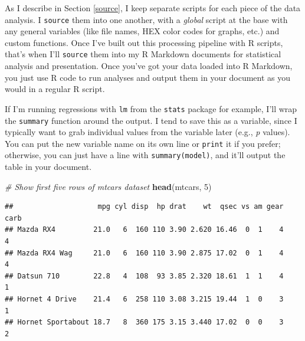\documentclass[
]{book}
\newenvironment{Shaded}{\begin{snugshade}}{\end{snugshade}}
\newcommand{\CommentTok}[1]{\textcolor[rgb]{0.56,0.35,0.01}{\textit{#1}}}
\newcommand{\DecValTok}[1]{\textcolor[rgb]{0.00,0.00,0.81}{#1}}
\newcommand{\KeywordTok}[1]{\textcolor[rgb]{0.13,0.29,0.53}{\textbf{#1}}}
\newcommand{\NormalTok}[1]{#1}
\newcommand{\OperatorTok}[1]{\textcolor[rgb]{0.81,0.36,0.00}{\textbf{#1}}}
\newcommand{\StringTok}[1]{\textcolor[rgb]{0.31,0.60,0.02}{#1}}
\begin{document}
As I describe in Section \ref{source}, I keep separate scripts for each piece of the data analysis. I \texttt{source} them into one another, with a \emph{global} script at the base with any general variables (like file names, HEX color codes for graphs, etc.) and custom functions. Once I've built out this processing pipeline with R scripts, that's when I'll \texttt{source} them into my R Markdown documents for statistical analysis and presentation. Once you've got your data loaded into R Markdown, you just use R code to run analyses and output them in your document as you would in a regular R script.

If I'm running regressions with \texttt{lm} from the \texttt{stats} package for example, I'll wrap the \texttt{summary} function around the output. I tend to save this as a variable, since I typically want to grab individual values from the variable later (e.g., \emph{p} values). You can put the new variable name on its own line or \texttt{print} it if you prefer; otherwise, you can just have a line with \texttt{summary(model)}, and it'll output the table in your document.

\begin{Shaded}
\begin{Highlighting}[]
\CommentTok{# Show first five rows of mtcars dataset}
\KeywordTok{head}\NormalTok{(mtcars, }\DecValTok{5}\NormalTok{)}
\end{Highlighting}
\end{Shaded}

\begin{verbatim}
##                    mpg cyl disp  hp drat    wt  qsec vs am gear carb
## Mazda RX4         21.0   6  160 110 3.90 2.620 16.46  0  1    4    4
## Mazda RX4 Wag     21.0   6  160 110 3.90 2.875 17.02  0  1    4    4
## Datsun 710        22.8   4  108  93 3.85 2.320 18.61  1  1    4    1
## Hornet 4 Drive    21.4   6  258 110 3.08 3.215 19.44  1  0    3    1
## Hornet Sportabout 18.7   8  360 175 3.15 3.440 17.02  0  0    3    2
\end{verbatim}

\begin{Shaded}
\end{Shaded}
\end{document}
